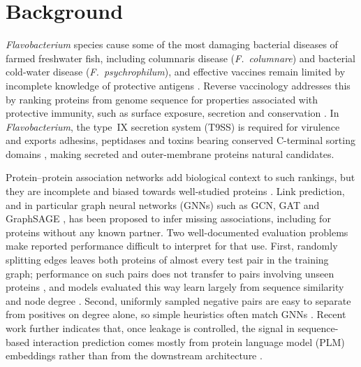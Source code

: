 \documentclass[pdflatex,sn-mathphys-num]{sn-jnl}
\begin{document}

\maketitle

\section{Background}\label{sec:background}

\textit{Flavobacterium} species cause some of the most damaging bacterial diseases of farmed freshwater fish, including columnaris disease (\textit{F.\ columnare}) and bacterial cold-water disease (\textit{F.\ psychrophilum}), and effective vaccines remain limited by incomplete knowledge of protective antigens \cite{gomez2014f,hoare2017efficacy,cai2021deciphering}. Reverse vaccinology addresses this by ranking proteins from genome sequence for properties associated with protective immunity, such as surface exposure, secretion and conservation \cite{sunita2020computational,bravi2024development,rawal2021identification}. In \textit{Flavobacterium}, the type~IX secretion system (T9SS) is required for virulence and exports adhesins, peptidases and toxins bearing conserved C-terminal sorting domains \cite{li2017t9ss,barbier2020t9ss,thunes2021t9ss}, making secreted and outer-membrane proteins natural candidates.

Protein--protein association networks add biological context to such rankings, but they are incomplete and biased towards well-studied proteins \cite{szklarczyk2023string,szklarczyk2025string}. Link prediction, and in particular graph neural networks (GNNs) such as GCN, GAT and GraphSAGE \cite{kipf2017gcn,velickovic2018gat,hamilton2017inductive}, has been proposed to infer missing associations, including for proteins without any known partner. Two well-documented evaluation problems make reported performance difficult to interpret for that use. First, randomly splitting edges leaves both proteins of almost every test pair in the training graph; performance on such pairs does not transfer to pairs involving unseen proteins \cite{park2012flaw}, and models evaluated this way learn largely from sequence similarity and node degree \cite{bernett2024cracking}. Second, uniformly sampled negative pairs are easy to separate from positives on degree alone, so simple heuristics often match GNNs \cite{li2023linkpitfalls,dunham2021benchmark}. Recent work further indicates that, once leakage is controlled, the signal in sequence-based interaction prediction comes mostly from protein language model (PLM) embeddings rather than from the downstream architecture \cite{reim2025plateau}.
\end{document}
